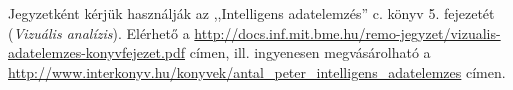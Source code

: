 

Jegyzetként kérjük használják az ,,Intelligens adatelemzés'' c. könyv 5. fejezetét (\emph{Vizuális analízis}). Elérhető a \url{http://docs.inf.mit.bme.hu/remo-jegyzet/vizualis-adatelemzes-konyvfejezet.pdf} címen, ill. ingyenesen megvásárolható a \url{http://www.interkonyv.hu/konyvek/antal_peter_intelligens_adatelemzes} címen.

%
%
%
%
%
%
%
%
%
